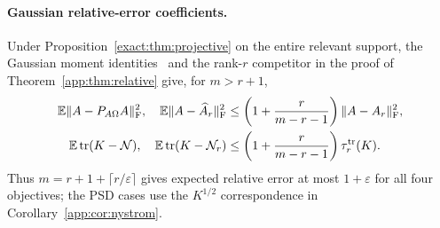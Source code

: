 \documentclass[11pt,a4paper]{article}
\theoremstyle{definition}\newtheorem{definition}[theorem]{Definition}
\theoremstyle{remark}\newtheorem{remark}[theorem]{Remark}
\numberwithin{equation}{section}
\newcommand{\norm}[1]{\lVert#1\rVert}\newcommand{\ip}[2]{\langle#1,#2\rangle}
\DeclareMathOperator{\tr}{tr}\DeclareMathOperator{\rank}{rank}
\begin{document}
\paragraph{Gaussian relative-error coefficients.}
Under Proposition~\ref{exact:thm:projective} on the entire relevant
support, the Gaussian moment identities~\cite[Propositions~10.1 and A.5]{HMT2011}
and the rank-$r$ competitor in the proof of Theorem~\ref{app:thm:relative}
give, for $m>r+1$,
\begin{align}
 \E\norm{A-P_{A\Omega}A}_\F^2,\quad
 \E\norm{A-\widehat A_r}_\F^2
 &\le\left(1+\frac{r}{m-r-1}\right)\norm{A-A_r}_\F^2,
 \label{exact:eq:relative-rect}\\
 \E\tr(K-\mathcal N),\quad\E\tr(K-\mathcal N_r)
 &\le\left(1+\frac{r}{m-r-1}\right)\tau_r^{\rm tr}(K).
 \label{exact:eq:relative-psd}
\end{align}
Thus $m=r+1+\lceil r/\varepsilon\rceil$ gives expected relative error
at most $1+\varepsilon$ for all four objectives; the PSD cases use the
$K^{1/2}$ correspondence in Corollary~\ref{app:cor:nystrom}.
\end{document}
